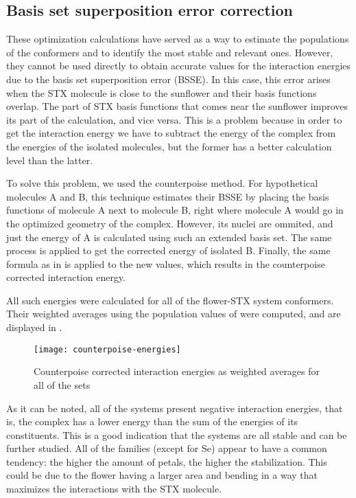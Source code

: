 \subsection{Basis set superposition error correction}
These optimization calculations have served as a way to estimate the populations of the conformers and to identify the most stable and relevant ones.
However, they cannot be used directly to obtain accurate values for the interaction energies due to the basis set superposition error (BSSE).
In this case, this error arises when the STX molecule is close to the sunflower and their basis functions overlap.
The part of STX basis functions that comes near the sunflower improves its part of the calculation, and vice versa.
This is a problem because in order to get the interaction energy we have to subtract the energy of the complex from the energies of the isolated molecules, but the former has a better calculation level than the latter.

To solve this problem, we used the counterpoise method.
For hypothetical molecules A and B, this technique estimates their BSSE by placing the basis functions of molecule A next to molecule B, right where molecule A would go in the optimized geometry of the complex.
However, its nuclei are ommited, and just the energy of A is calculated using such an extended basis set.
The same process is applied to get the corrected energy of isolated B.
Finally, the same formula as in  is applied to the new values, which results in the counterpoise corrected interaction energy.

All such energies were calculated for all of the flower-STX system conformers.
Their weighted averages using the population values of  were computed, and are displayed in .

\begin{figure}
    \texttt{[image: counterpoise-energies]}
    \caption[Counterpoise corrected interaction energies]{Counterpoise corrected interaction energies as weighted averages for all of the sets}
\end{figure}

As it can be noted, all of the systems present negative interaction energies, that is, the complex has a lower energy than the sum of the energies of its constituents.
This is a good indication that the systems are all stable and can be further studied.
All of the families (except for Se) appear to have a common tendency: the higher the amount of petals, the higher the stabilization. This could be due to the flower having a larger area and bending in a way that maximizes the interactions with the STX molecule.

